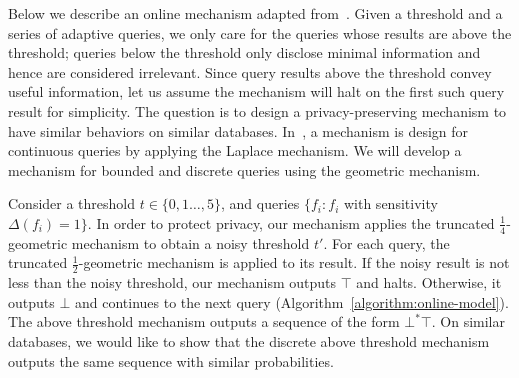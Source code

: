 Below we describe an online mechanism adapted from~\cite{DR:14:AFDP}.
Given a threshold and a series of adaptive queries, we only care for
the queries whose results are above the threshold; queries below the
threshold only disclose minimal information and hence are considered
irrelevant. Since query results above the threshold convey useful
information, let us assume the mechanism will halt on the first such
query result for simplicity. The question is to design a
privacy-preserving mechanism to have similar behaviors on similar
databases. In~\cite{DR:14:AFDP}, a mechanism is design for continuous
queries by applying the Laplace mechanism. We will develop a mechanism
for bounded and discrete queries using the geometric mechanism.

Consider a threshold $t \in
\{ 0, 1 \ldots, 5\}$, and queries $\{ f_i : f_i $ with sensitivity $\Delta
(f_i) = 1 \}$. In order to protect privacy, our mechanism applies the
truncated $\frac{1}{4}$-geometric mechanism to obtain a noisy
threshold $t'$. For each query, the truncated $\frac{1}{2}$-geometric
mechanism is applied to its result. If the noisy result is not less
than the noisy threshold, our mechanism outputs $\top$ and
halts. Otherwise, it outputs $\bot$ and continues to the next query
(Algorithm~\ref{algorithm:online-model}). The above threshold
mechanism outputs a sequence of the form $\bot^* \top$. On
similar databases, we would like to show that the discrete above
threshold mechanism outputs the same sequence with similar
probabilities. 
